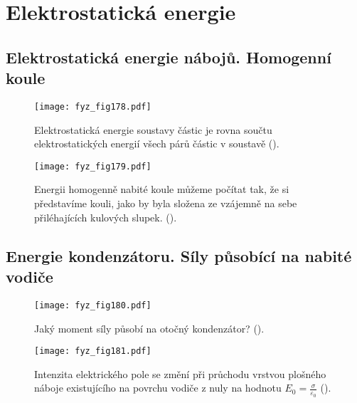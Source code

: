 \chapter{Elektrostatická energie}\label{fyz:IIchapVI}
\minitoc


\section{Elektrostatická energie nábojů. Homogenní koule}\label{fyz:IIchapVIsecI}

  \begin{figure}[ht!]  %
    \centering
    \texttt{[image: fyz\_fig178.pdf]}
    \caption{Elektrostatická energie soustavy částic je rovna součtu elektrostatických energií 
             všech párů částic v soustavě
             (\cite[s.~140]{Feynman02}).}
    \label{fyz:fig178}
  \end{figure}
  
  \begin{figure}[ht!]  %
    \centering
    \texttt{[image: fyz\_fig179.pdf]}
    \caption{Energii homogenně nabité koule můžeme počítat tak, že si představíme kouli, jako by 
             byla složena ze vzájemně na sebe přiléhajících kulových slupek. 
             (\cite[s.~141]{Feynman02}).}
    \label{fyz:fig179}
  \end{figure}

\section{Energie kondenzátoru. Síly působící na nabité vodiče}\label{fyz:IIchapVIsecII}

  \begin{figure}[ht!]  %
    \centering
    \texttt{[image: fyz\_fig180.pdf]}
    \caption{Jaký moment síly působí na otočný kondenzátor?
             (\cite[s.~144]{Feynman02}).}
    \label{fyz:fig180}
  \end{figure}
  
  \begin{figure}[ht!]  %
    \centering
    \texttt{[image: fyz\_fig181.pdf]}
    \caption{Intenzita elektrického pole se změní při průchodu vrstvou plošného náboje existujícího 
             na povrchu vodiče z nuly na hodnotu \(E_0 = \frac{\sigma}{\varepsilon_0}\)
             (\cite[s.~145]{Feynman02}).}
    \label{fyz:fig181}
  \end{figure}
  
